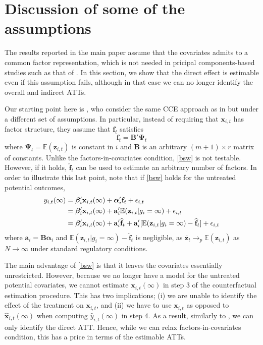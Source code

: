 \documentclass[12pt,fleqn]{article}
\def\*#1{\mathbf{#1}}
\def\+#1{\boldsymbol{#1}}
\begin{document}
\section{Discussion of some of the assumptions}
\renewcommand{\theequation}{B.\arabic{equation}}

The results reported in the main paper assume that the covariates admits to a common factor representation, which is not needed in pricipal components-based studies such as that of \citet{chan2022pcdid}. In this section, we show that the direct effect is estimable even if this assumption fails, although in that case we can no longer identify the overall and indirect ATTs.

Our starting point here is \citet{Brown_Schmidt_Wooldridge_2021}, who consider the same CCE approach as in \citet{pesaran2006estimation} but under a different set of assumptions. In particular, instead of requiring that $\*x_{i,t}$ has factor structure, they assume that $\*f_t$ satisfies
\begin{equation}\label{bsw}
    \*f_t = \*B'\+\Psi_t
\end{equation}
where $\+\Psi_t = \mathbb{E}(\*z_{i,t})$ is constant in $i$ and $\*B$ is an arbitrary $(m+1)\times r$ matrix of constants. Unlike the factors-in-covariates condition, \eqref{bsw} is not testable. However, if it holds, $\widehat{\*f}_t$ can be used to estimate an arbitrary number of factors. In order to illustrate this last point, note that if \eqref{bsw} holds for the untreated potential outcomes,
\begin{align}
    y_{i,t}(\infty) &= \+\beta_i'\*x_{i,t}(\infty) +  \+\alpha_i'\*f_t + \epsilon_{i,t} \notag\\
    & = \+\beta_i'\*x_{i,t}(\infty) + \*a_i'\mathbb{E}(\*z_{i,t} | g_i = \infty)  + \epsilon_{i,t}\notag\\
    & = \+\beta_i'\*x_{i,t}(\infty) + \*a_i'\widehat{\*f}_t + \*a_i'[\mathbb{E}(\*z_{i,t} | g_i = \infty)- \widehat{\*f}_t]  + \epsilon_{i,t}
\end{align}
where $\*a_i = \*B\+\alpha_i$ and $\mathbb{E}(\*z_{i,t} | g_i = \infty)- \widehat{\*f}_t$ is negligible, as $\overline{\*z}_t \to_p \mathbb{E}(\*z_{i,t})$ as $N\to \infty$ under standard regulatory conditions.

The main advantage of \eqref{bsw} is that it leaves the covariates essentially unrestricted. However, because we no longer have a model for the untreated potential covariates, we cannot estimate $\*x_{i,t}(\infty)$ in step 3 of the counterfactual estimation procedure. This has two implications; (i) we are unable to identify the effect of the treatment on $\*x_{i,t}$, and (ii) we have to use $\*x_{i,t}$ as opposed to $\widehat{\*x}_{i,t}(\infty)$ when computing $\widehat{y}_{i,t}(\infty)$ in step 4. As a result, similarly to \citet{chan2022pcdid}, we can only identify the direct ATT. Hence, while we can relax factors-in-covariates condition, this has a price in terms of the estimable ATTs.

\pagebreak


\end{document}
